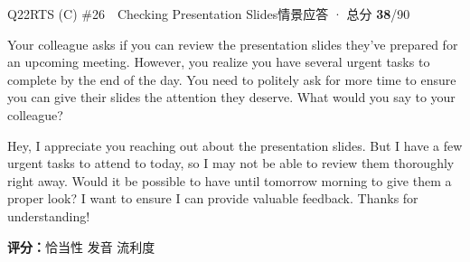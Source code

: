 \begin{qblock}{Q22\quad RTS (C) \#26\ \ Checking Presentation Slides}{情景应答 · 总分 \textcolor{cAccent}{\bfseries 38}/90}
\begin{promptbox}
Your colleague asks if you can review the presentation slides they've prepared for an upcoming meeting. However, you realize you have several urgent tasks to complete by the end of the day. You need to politely ask for more time to ensure you can give their slides the attention they deserve. What would you say to your colleague?
\end{promptbox}
\begin{modelbox}
Hey, I appreciate you reaching out about the presentation slides. But I have a few urgent tasks to attend to today, so I may not be able to review them thoroughly right away. Would it be possible to have until tomorrow morning to give them a proper look? I want to ensure I can provide valuable feedback. Thanks for understanding!
\end{modelbox}
\asrlegend
\begin{asrbox}
                                                               
\end{asrbox}
\smallskip
{\small\textbf{评分：}恰当性  \quad\textperiodcentered\quad 发音  \quad\textperiodcentered\quad 流利度 }
\end{qblock}

